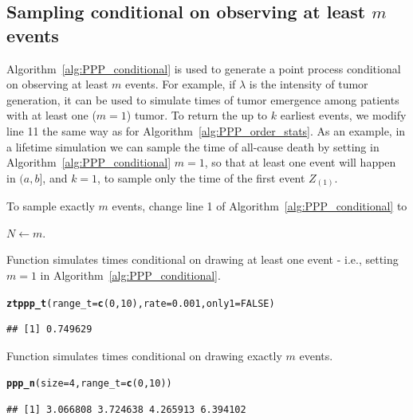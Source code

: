 \documentclass[article,nojss]{jss}\usepackage[]{graphicx}\usepackage[]{xcolor}
\makeatletter
\newcommand{\hlnum}[1]{\textcolor[rgb]{0.686,0.059,0.569}{#1}}%
\newcommand{\hlstd}[1]{\textcolor[rgb]{0.345,0.345,0.345}{#1}}%
\newcommand{\hlkwc}[1]{\textcolor[rgb]{0.333,0.667,0.333}{#1}}%
\newcommand{\hlkwd}[1]{\textcolor[rgb]{0.737,0.353,0.396}{\textbf{#1}}}%
\newenvironment{kframe}{%
 \def\at@end@of@kframe{}%
 \ifinner\ifhmode%
  \def\at@end@of@kframe{\end{minipage}}%
  \begin{minipage}{\columnwidth}%
 \fi\fi%
 \def\FrameCommand##1{\hskip\@totalleftmargin \hskip-\fboxsep
 \colorbox{shadecolor}{##1}\hskip-\fboxsep
     \hskip-\linewidth \hskip-\@totalleftmargin \hskip\columnwidth}%
 \MakeFramed {\advance\hsize-\width
   \@totalleftmargin\z@ \linewidth\hsize
   \@setminipage}}%
 {\par\unskip\endMakeFramed%
 \at@end@of@kframe}
\newenvironment{knitrout}{}{} %
\newcommand{\fct}[1]{\code{#1()}}
\makeatother
\begin{document}
\subsection{Sampling conditional on observing at least $m$ events}\label{sec:PPP_order_stats}



Algorithm~\ref{alg:PPP_conditional} is used to generate a point process conditional on observing at least $m$ events. For example, if $\lambda$ is the intensity of tumor generation, it can be used to simulate times of tumor emergence among patients with at least one ($m=1$) tumor. To return the up to $k$ earliest events, we modify line 11 the same way as for Algorithm~\ref{alg:PPP_order_stats}. As an example, in a lifetime simulation we can sample the time of all-cause death by setting in Algorithm~\ref{alg:PPP_conditional} $m=1$, so that at least one event will happen in $(a, b]$, and $k = 1$, to sample only the time of the first event $Z_{(1)}$.

To sample exactly $m$ events, change line 1 of Algorithm~\ref{alg:PPP_conditional} to
\begin{center}
$N \gets m$.
\end{center}

Function \fct{ztppp\_t} simulates times conditional on drawing at least one event - i.e., setting $m=1$ in Algorithm~\ref{alg:PPP_conditional}.
\begin{knitrout}
\color{fgcolor}\begin{kframe}
\begin{alltt}
\hlkwd{ztppp_t}\hlstd{(}\hlkwc{range_t} \hlstd{=} \hlkwd{c}\hlstd{(}\hlnum{0}\hlstd{,} \hlnum{10}\hlstd{),} \hlkwc{rate} \hlstd{=} \hlnum{0.001}\hlstd{,} \hlkwc{only1} \hlstd{=} \hlnum{FALSE}\hlstd{)}
\end{alltt}
\begin{verbatim}
## [1] 0.749629
\end{verbatim}
\end{kframe}
\end{knitrout}

Function \fct{ppp\_n} simulates times conditional on drawing exactly $m$ events.
\begin{knitrout}
\color{fgcolor}\begin{kframe}
\begin{alltt}
\hlkwd{ppp_n}\hlstd{(}\hlkwc{size} \hlstd{=} \hlnum{4}\hlstd{,} \hlkwc{range_t} \hlstd{=} \hlkwd{c}\hlstd{(}\hlnum{0}\hlstd{,} \hlnum{10}\hlstd{))}
\end{alltt}
\begin{verbatim}
## [1] 3.066808 3.724638 4.265913 6.394102
\end{verbatim}
\end{kframe}
\end{knitrout}
\end{document}
